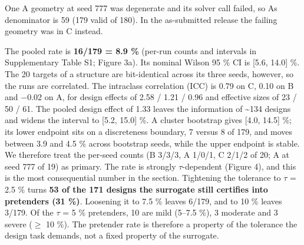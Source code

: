 \documentclass[11pt,a4paper]{article}
\begin{document}
\dag{}One A geometry at seed 777 was degenerate and its solver call failed, so A\textquotesingle s
denominator is 59 (179 valid of 180). In the as-submitted release the failing geometry
was in C instead.

The pooled rate is \textbf{16/179 = 8.9 \%} (per-run counts and intervals in Supplementary
Table S1; Figure 3a). Its nominal Wilson 95 \% CI is {[}5.6, 14.0{]} \%. The 20 targets of a
structure are bit-identical across its three seeds, however, so the runs are correlated.
The intraclass correlation (ICC) is 0.79 on C, 0.10 on B and \ensuremath{-}0.02 on A, for design effects of
2.58 / 1.21 / 0.96 and effective sizes of 23 / 50 / 61. The pooled design effect of 1.33
leaves the information of \textasciitilde134 designs and widens the interval to {[}5.2, 15.0{]} \%. A cluster
bootstrap gives {[}4.0, 14.5{]} \%; its lower endpoint sits on a discreteness boundary, 7
versus 8 of 179, and moves between 3.9 and 4.5 \% across bootstrap seeds, while the upper
endpoint is stable. We therefore treat the per-seed counts (B 3/3/3, A 1/0/1, C 2/1/2 of
20; A at seed 777 of 19) as primary. The rate is strongly \ensuremath{\tau}-dependent (Figure 4), and this
is the most consequential number in the section. Tightening the tolerance to \ensuremath{\tau} = 2.5 \%
turns \textbf{53 of the 171 designs the surrogate still certifies into pretenders (31 \%)}.
Loosening it to 7.5 \% leaves 6/179, and to 10 \% leaves 3/179. Of the \ensuremath{\tau} = 5 \% pretenders,
10 are mild (5--7.5 \%), 3 moderate and 3 severe (\ensuremath{\geq} 10 \%). The pretender rate is therefore a
property of the tolerance the design task demands, not a fixed property of the surrogate.
\end{document}
